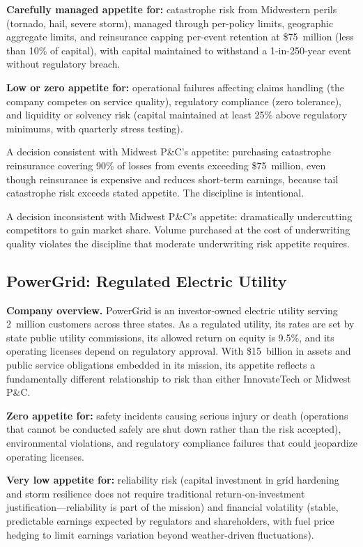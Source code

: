 \documentclass[11pt,openany]{book}
\begin{document}
\textbf{Carefully managed appetite for:} catastrophe risk from Midwestern perils
(tornado, hail, severe storm), managed through per-policy limits, geographic
aggregate limits, and reinsurance capping per-event retention at \$75~million
(less than 10\% of capital), with capital maintained to withstand a 1-in-250-year
event without regulatory breach.

\textbf{Low or zero appetite for:} operational failures affecting claims handling
(the company competes on service quality), regulatory compliance (zero tolerance),
and liquidity or solvency risk (capital maintained at least 25\% above regulatory
minimums, with quarterly stress testing).

A decision consistent with Midwest P\&C's appetite: purchasing catastrophe
reinsurance covering 90\% of losses from events exceeding \$75~million, even
though reinsurance is expensive and reduces short-term earnings, because tail
catastrophe risk exceeds stated appetite. The discipline is intentional.

A decision inconsistent with Midwest P\&C's appetite: dramatically undercutting
competitors to gain market share. Volume purchased at the cost of underwriting
quality violates the discipline that moderate underwriting risk appetite requires.

\subsection{PowerGrid: Regulated Electric Utility}
\label{subsec:powergrid}

\textbf{Company overview.} PowerGrid is an investor-owned electric utility
serving 2~million customers across three states. As a regulated utility, its
rates are set by state public utility commissions, its allowed return on equity
is 9.5\%, and its operating licenses depend on regulatory approval. With
\$15~billion in assets and public service obligations embedded in its mission,
its appetite reflects a fundamentally different relationship to risk than either
InnovateTech or Midwest P\&C.

\textbf{Zero appetite for:} safety incidents causing serious injury or death
(operations that cannot be conducted safely are shut down rather than the risk
accepted), environmental violations, and regulatory compliance failures that could
jeopardize operating licenses.

\textbf{Very low appetite for:} reliability risk (capital investment in grid
hardening and storm resilience does not require traditional return-on-investment
justification---reliability is part of the mission) and financial volatility
(stable, predictable earnings expected by regulators and shareholders, with fuel
price hedging to limit earnings variation beyond weather-driven fluctuations).
\end{document}
